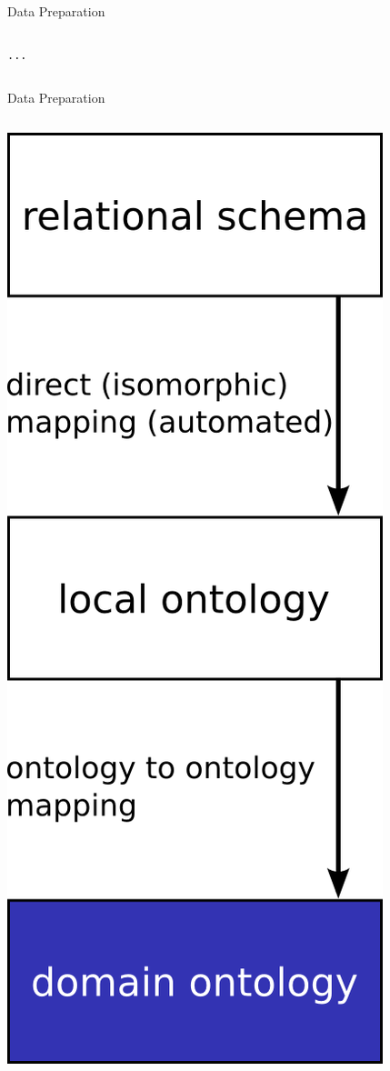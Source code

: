 \message{ !name(presentation.tex)}\documentclass{beamer}
\begin{document}
\begin{frame}[fragile]{Data Preparation}
\begin{columns}
\begin{column}{.66\textwidth}
{\begin{verbatim}
...
\end{verbatim}
}
\end{column}%
\end{columns}
\end{frame}






\begin{frame}[fragile]{Data Preparation}
\begin{columns}
\begin{column}{.3\textwidth}
\includegraphics[width=\textwidth,height=.88\textheight,keepaspectratio]{g3}

\end{column}
\end{columns}
\end{frame}
\end{document}
